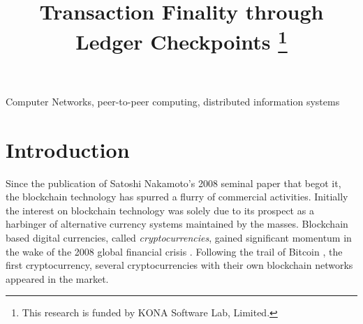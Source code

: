 \documentclass[conference]{IEEEtran}
\begin{document}
\title{Transaction Finality through Ledger Checkpoints 
	\thanks{This research is funded by KONA Software Lab, Limited.}
}

\author{
	\and		
	\and
}
\maketitle

\begin{abstract}
\end{abstract}

\begin{IEEEkeywords}
Computer Networks, peer-to-peer computing, distributed information systems
\end{IEEEkeywords}

\section{Introduction}
Since the publication of Satoshi Nakamoto's 2008 seminal paper \cite{bitcoin} that begot it, the blockchain technology has spurred a flurry of commercial activities. Initially the interest on blockchain technology was solely due to its prospect as a harbinger of alternative currency systems maintained by the masses. Blockchain based digital currencies, called \textit{cryptocurrencies}, gained significant momentum in the wake of the 2008 global financial crisis \cite{fincrisis}. Following the trail of Bitcoin \cite{bitcoin}, the first cryptocurrency, several cryptocurrencies \cite{bitcoinCash} \cite{David:2018:DCW:3208446} \cite{Takashima:2018:LUG:3235215} \cite{dogecoin} \cite{neo} with their own blockchain networks appeared in the market.
 
\end{document}
